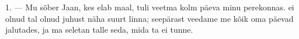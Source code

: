 %
%
%
%
%
%

\VUsaut{4.0mm}
\VUsaut{3.0mm}

\VUsaut{3.0mm}

1. --- Mu sõber Jaan, kes elab maal, tuli veetma kolm päeva minu perekonnas.
 ei olnud tal olnud juhust näha suurt linna; seepärast veedame me kõik oma
päevad jalutades, ja ma seletan talle seda, mida ta ei tunne.

